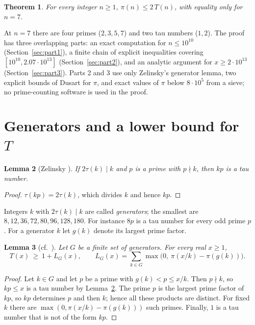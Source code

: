 \documentclass[11pt]{article}
\newtheorem{theorem}{Theorem}
\newtheorem{lemma}[theorem]{Lemma}
\theoremstyle{remark}
\begin{document}
\begin{theorem}\label{thm:main}
For every integer $n \ge 1$, $\pi(n) \le 2\,T(n)$, with equality only for $n = 7$.
\end{theorem}

At $n = 7$ there are four primes ($2, 3, 5, 7$) and two tau numbers ($1, 2$). The proof has three overlapping parts: an exact computation for $n \le 10^{10}$ (Section~\ref{sec:part1}), a finite chain of explicit inequalities covering $[10^{10}, 2.07\cdot 10^{13}]$ (Section~\ref{sec:part2}), and an analytic argument for $x \ge 2\cdot 10^{13}$ (Section~\ref{sec:part3}). Parts 2 and 3 use only Zelinsky's generator lemma, two explicit bounds of Dusart for $\pi$, and exact values of $\pi$ below $8\cdot 10^5$ from a sieve; no prime-counting software is used in the proof.

\section{Generators and a lower bound for $T$}

\begin{lemma}[Zelinsky {\cite[Lemma~18]{Ze}}]\label{lem:gen}
If $2\tau(k) \mid k$ and $p$ is a prime with $p \nmid k$, then $kp$ is a tau number.
\end{lemma}

\begin{proof}
$\tau(kp) = 2\tau(k)$, which divides $k$ and hence $kp$.
\end{proof}

Integers $k$ with $2\tau(k) \mid k$ are called \emph{generators}; the smallest are $8, 12, 36, 72, 80, 96, 128, 180$. For instance $8p$ is a tau number for every odd prime $p$. For a generator $k$ let $g(k)$ denote its largest prime factor.

\begin{lemma}[cf.\ {\cite[Lemma~20]{Ze}}]\label{lem:lower}
Let $G$ be a finite set of generators. For every real $x \ge 1$,
\[
T(x) \ \ge\ 1 + L_G(x), \qquad L_G(x) = \sum_{k \in G} \max\bigl(0,\ \pi(x/k) - \pi(g(k))\bigr).
\]
\end{lemma}

\begin{proof}
Let $k \in G$ and let $p$ be a prime with $g(k) < p \le x/k$. Then $p \nmid k$, so $kp \le x$ is a tau number by Lemma~\ref{lem:gen}. The prime $p$ is the largest prime factor of $kp$, so $kp$ determines $p$ and then $k$; hence all these products are distinct. For fixed $k$ there are $\max(0, \pi(x/k) - \pi(g(k)))$ such primes. Finally, $1$ is a tau number that is not of the form $kp$.
\end{proof}
\end{document}
